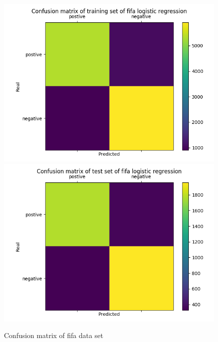 \documentclass{article}
\begin{document}
\begin{figure}[h]
  \centering
  \includegraphics[scale=0.3]{fifa_lo_train.png}
  \includegraphics[scale=0.3]{fifa_lo_test.png}
  \caption{Confusion matrix of fifa data set}
\end{figure}

\FloatBarrier
\end{document}
